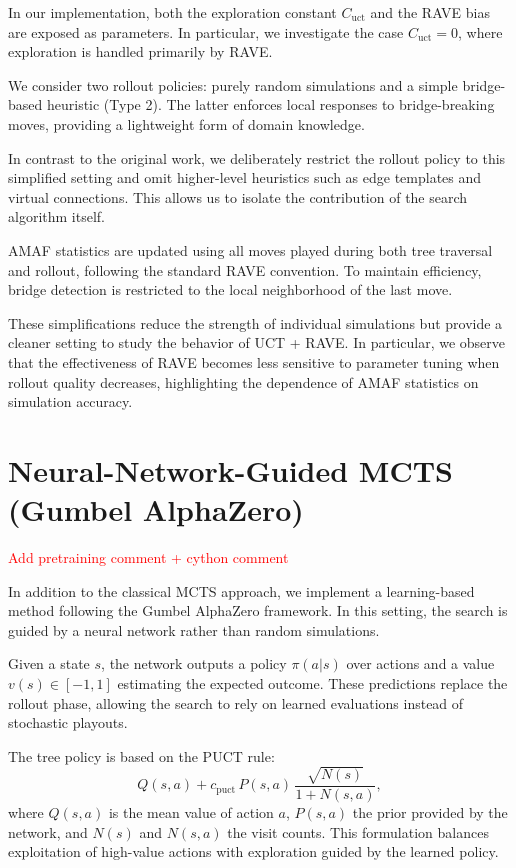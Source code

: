 \documentclass[11pt,a4paper]{article}
\begin{document}
In our implementation, both the exploration constant $C_{\text{uct}}$ and the RAVE bias are exposed as parameters. In particular, we investigate the case $C_{\text{uct}} = 0$, where exploration is handled primarily by RAVE.

\medskip

We consider two rollout policies: purely random simulations and a simple bridge-based heuristic (Type 2). The latter enforces local responses to bridge-breaking moves, providing a lightweight form of domain knowledge.

In contrast to the original work, we deliberately restrict the rollout policy to this simplified setting and omit higher-level heuristics such as edge templates and virtual connections. This allows us to isolate the contribution of the search algorithm itself.

\medskip

AMAF statistics are updated using all moves played during both tree traversal and rollout, following the standard RAVE convention. To maintain efficiency, bridge detection is restricted to the local neighborhood of the last move.

\medskip

These simplifications reduce the strength of individual simulations but provide a cleaner setting to study the behavior of UCT + RAVE. In particular, we observe that the effectiveness of RAVE becomes less sensitive to parameter tuning when rollout quality decreases, highlighting the dependence of AMAF statistics on simulation accuracy.

\section{Neural-Network-Guided MCTS (Gumbel AlphaZero)}

\textcolor{red}{Add pretraining comment + cython comment}

In addition to the classical MCTS approach, we implement a learning-based method following the Gumbel AlphaZero framework. In this setting, the search is guided by a neural network rather than random simulations.

Given a state $s$, the network outputs a policy $\pi(a|s)$ over actions and a value $v(s) \in [-1,1]$ estimating the expected outcome. These predictions replace the rollout phase, allowing the search to rely on learned evaluations instead of stochastic playouts.

The tree policy is based on the PUCT rule:
\[
Q(s,a) + c_{\text{puct}} \, P(s,a) \, \frac{\sqrt{N(s)}}{1 + N(s,a)},
\]
where $Q(s,a)$ is the mean value of action $a$, $P(s,a)$ the prior provided by the network, and $N(s)$ and $N(s,a)$ the visit counts. This formulation balances exploitation of high-value actions with exploration guided by the learned policy.
\end{document}
